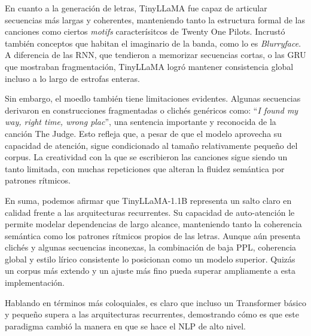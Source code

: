 En cuanto a la generación de letras, TinyLLaMA fue capaz de articular secuencias más largas y coherentes,
manteniendo tanto la estructura formal de las canciones como ciertos \textit{motifs} caracterísitcos
de Twenty One Pilots. Incrustó también conceptos que habitan el imaginario de la banda, como lo es
\textit{Blurryface}. A diferencia de las RNN, que tendieron a memorizar secuencias cortas, o las
GRU que mostraban fragmentación, TinyLLaMA logró mantener consistencia global incluso a lo largo
de estrofas enteras. 

Sin embargo, el moedlo también tiene limitaciones evidentes. Algunas secuencias derivaron en construcciones
fragmentadas o clichés genéricos como: ``\textit{I found my way, right time, wrong plac}'', una
sentencia importante y reconocida de la canción The Judge. Esto refleja que, a pesar de que 
el modelo aprovecha su capacidad de atención, sigue condicionado al tamaño relativamente pequeño
del corpus. La creatividad con la que se escribieron las canciones sigue siendo un tanto limitada, 
con muchas repeticiones que alteran la fluidez semántica por patrones rítmicos. 

En suma, podemos afirmar que TinyLLaMA-1.1B representa un salto claro en calidad frente a las arquitecturas
recurrentes. Su capacidad de auto-atención le permite modelar dependencias de largo alcance,
manteniendo tanto la coherencia semántica como los patrones rítmicos propios de las letras. Aunque
aún presenta clichés y algunas secuencias inconexas, la combinación de baja PPL, coherencia global y
estilo lírico consistente lo posicionan como un modelo superior. Quizás un corpus más extendo
y un ajuste más fino pueda superar ampliamente a esta implementación. 

Hablando en términos más coloquiales, es claro que incluso un Transformer básico y pequeño supera 
a las arquitecturas recurrentes, demostrando cómo es que este paradigma cambió la manera en que 
se hace el NLP de alto nivel. 

\clearpage